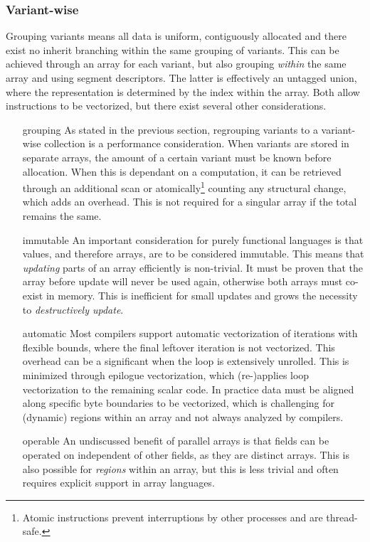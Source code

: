 \documentclass{article}
\begin{document}
\newpage

\subsubsection{Variant-wise}

Grouping variants means all data is uniform, contiguously allocated and there exist no inherit branching within the same grouping of variants.
This can be achieved through an array for each variant, but also grouping {\it within} the same array and using segment descriptors.
The latter is effectively an untagged union, where the representation is determined by the index within the array.
Both allow instructions to be vectorized, but there exist several other considerations.

\begin{itemize}
    \item [grouping]
    As stated in the previous section, regrouping variants to a variant-wise collection is a performance consideration.
    When variants are stored in separate arrays, the amount of a certain variant must be known before allocation.
    When this is dependant on a computation, it can be retrieved through an additional scan or atomically\footnote{Atomic instructions prevent interruptions by other processes and are thread-safe.} counting any structural change, which adds an overhead.
    This is not required for a singular array if the total remains the same.

    \item [immutable]
    An important consideration for purely functional languages is that values, and therefore arrays, are to be considered immutable.
    This means that {\it{updating}} parts of an array efficiently is non-trivial.
    It must be proven that the array before update will never be used again, otherwise both arrays must co-exist in memory.
    This is inefficient for small updates and grows the necessity to {\it destructively update}\cite{destructive-update-array}.

    \item[automatic]
    Most compilers support automatic vectorization of iterations with flexible bounds, where the final leftover iteration is not vectorized.  
    This overhead can be a significant when the loop is extensively unrolled.
    This is minimized through epilogue vectorization, which (re-)applies loop vectorization to the remaining scalar code.
    In practice data must be aligned along specific byte boundaries to be vectorized, which is challenging for (dynamic) regions within an array and not always analyzed by compilers\cite{automatic-vectorization}.

    \item [operable]
    An undiscussed benefit of parallel arrays is that fields can be operated on independent of other fields, as they are distinct arrays.
    This is also possible for {\it regions} within an array, but this is less trivial and often requires explicit support in array languages\cite{accelerate-independent-regions}. 


\end{itemize}
\end{document}
